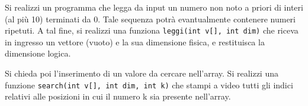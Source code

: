 \begin{Exercise}[label={ex:ricerca}]
    Si realizzi un programma che legga da input un numero non noto a priori di interi (al più 10) terminati da 0.
    Tale sequenza potrà evantualmente contenere numeri ripetuti.
    A tal fine, si realizzi una funziona \texttt{leggi(int v[], int dim)} che riceva in ingresso un vettore (vuoto) e la sua dimensione fisica,
    e restituisca la dimensione logica.
    
    Si chieda poi l'inserimento di un valore da cercare nell'array. 
    Si realizzi una funzione \texttt{search(int v[], int dim, int k)} che stampi a video tutti gli indici relativi alle posizioni in cui il numero k sia presente nell’array. 
\end{Exercise}

\begin{Answer}[ref={ex:ricerca}]
  	
\end{Answer}